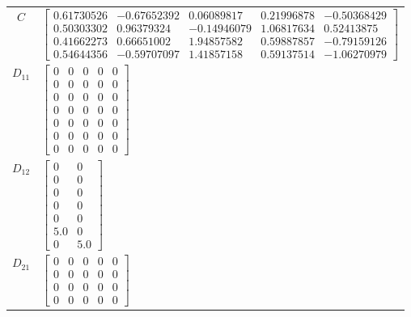 \begin{tabular}{cl}
   $C$    & $\left[\begin{matrix}0.61730526 & -0.67652392 & 0.06089817 & 0.21996878 & -0.50368429\\0.50303302 & 0.96379324 & -0.14946079 & 1.06817634 & 0.52413875\\0.41662273 & 0.66651002 & 1.94857582 & 0.59887857 & -0.79159126\\0.54644356 & -0.59707097 & 1.41857158 & 0.59137514 & -1.06270979\end{matrix}\right]$                                                                                         \\
 $D_{11}$ & $\left[\begin{matrix}0 & 0 & 0 & 0 & 0\\0 & 0 & 0 & 0 & 0\\0 & 0 & 0 & 0 & 0\\0 & 0 & 0 & 0 & 0\\0 & 0 & 0 & 0 & 0\\0 & 0 & 0 & 0 & 0\\0 & 0 & 0 & 0 & 0\end{matrix}\right]$                                                                                                                                                                                                                          \\
 $D_{12}$ & $\left[\begin{matrix}0 & 0\\0 & 0\\0 & 0\\0 & 0\\0 & 0\\5.0 & 0\\0 & 5.0\end{matrix}\right]$                                                                                                                                                                                                                                                                                                          \\
 $D_{21}$ & $\left[\begin{matrix}0 & 0 & 0 & 0 & 0\\0 & 0 & 0 & 0 & 0\\0 & 0 & 0 & 0 & 0\\0 & 0 & 0 & 0 & 0\end{matrix}\right]$                                                                                                                                                                                                                                                                                   \\
\hline
\end{tabular}